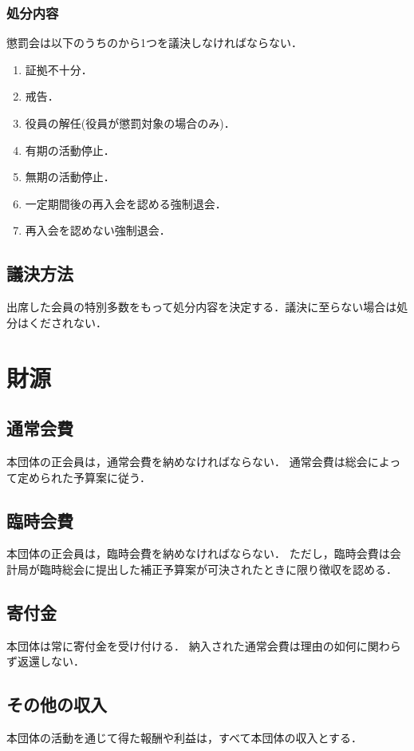 \documentclass{ltjsarticle}
\begin{document}
      \subsubsection{処分内容}\label{punishment}
        \jor
        懲罰会は以下のうちのから1つを議決しなければならない．
        \begin{enumerate}
          \item 証拠不十分．
          \item 戒告．
          \item 役員の解任(役員が懲罰対象の場合のみ)．
          \item 有期の活動停止．
          \item 無期の活動停止．
          \item 一定期間後の再入会を認める強制退会．
          \item 再入会を認めない強制退会．
        \end{enumerate}
      \subsection{議決方法}
        \jor
        出席した会員の特別多数をもって処分内容を決定する．議決に至らない場合は処分はくだされない．
  \section{財源}
    \subsection{通常会費}
      \jor
      本団体の正会員は，通常会費を納めなければならない．
      通常会費は総会によって定められた予算案に従う．
    \subsection{臨時会費}
      \jor
      本団体の正会員は，臨時会費を納めなければならない．
      ただし，臨時会費は会計局が臨時総会に提出した補正予算案が可決されたときに限り徴収を認める．
    \subsection{寄付金}
      \jor
      本団体は常に寄付金を受け付ける．
      納入された通常会費は理由の如何に関わらず返還しない．
    \subsection{その他の収入}
      \jor
      本団体の活動を通じて得た報酬や利益は，すべて本団体の収入とする．
\end{document}
